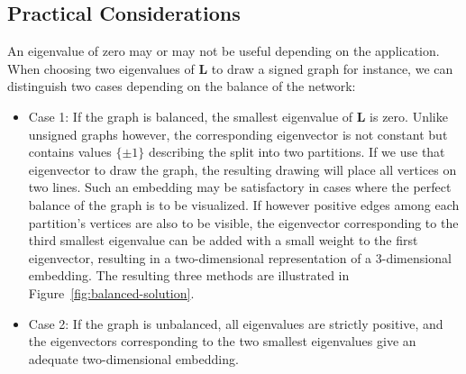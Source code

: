 \documentclass[11pt,a4paper]{book}
\begin{document}
\subsection{Practical Considerations}
An eigenvalue of zero may or may not be useful depending on the
application.  When choosing two eigenvalues of $\mathbf L$ to draw a
signed graph for instance, we can distinguish two cases depending on the
balance of the network:

\begin{itemize}
\item Case 1: 
  If the graph is balanced, the smallest eigenvalue of $\mathbf L$ is
  zero.  Unlike 
  unsigned graphs however, the corresponding eigenvector is not constant
  but contains values $\{\pm 1\}$ describing the split into two partitions.
  If we use that eigenvector to draw the graph, the resulting drawing
  will place all vertices on two lines.  Such an embedding may be
  satisfactory in cases where the perfect balance of the graph is to be
  visualized.  If however positive edges among each partition's vertices
  are also to be visible, the eigenvector corresponding to the third smallest
  eigenvalue can be added with a small weight to the first eigenvector,
  resulting in a two-dimensional representation of a 3-dimensional
  embedding.  
  The resulting three methods are illustrated in
  Figure~\ref{fig:balanced-solution}.  
\item Case 2: 
  If the graph is unbalanced, all eigenvalues are strictly positive, and
  the eigenvectors corresponding to the two smallest eigenvalues give an
  adequate two-dimensional embedding.  
\end{itemize}
\end{document}
